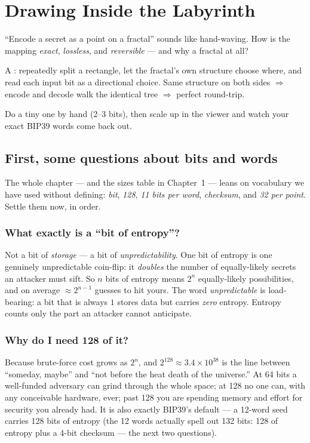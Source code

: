 \documentclass[a4paper,11pt]{report}
\newcommand{\probsoln}[3]{%
  \begin{description}[leftmargin=0pt,labelsep=0.5em,style=nextline]
    \item[\textcolor{attackcol}{Problem.}] #1
    \item[\textcolor{accent}{Solution.}] #2
    \item[\textcolor{modelcol}{Methodology.}] #3
  \end{description}}
\begin{document}
\chapter{Drawing Inside the Labyrinth}

\probsoln
{``Encode a secret as a point on a fractal'' sounds like hand-waving. How is the
mapping \emph{exact}, \emph{lossless}, and \emph{reversible} — and why a fractal
at all?}
{A \term{bisection bijection}: repeatedly split a rectangle, let the fractal's
own structure choose where, and read each input bit as a directional choice. Same
structure on both sides $\Rightarrow$ encode and decode walk the identical tree
$\Rightarrow$ perfect round-trip.}
{Do a tiny one by hand (2–3 bits), then scale up in the viewer and watch your
exact BIP39 words come back out.}

\section{First, some questions about bits and words}
The whole chapter — and the sizes table in Chapter~1 — leans on vocabulary we
have used without defining: \emph{bit}, \emph{128}, \emph{11 bits per word},
\emph{checksum}, and \emph{32 per point}. Settle them now, in order.

\subsection{What exactly is a ``bit of entropy''?}
Not a bit of \emph{storage} — a bit of \emph{unpredictability}. One bit of
entropy is one genuinely unpredictable coin-flip: it \emph{doubles} the number of
equally-likely secrets an attacker must sift. So $n$ bits of entropy means $2^n$
equally-likely possibilities, and on average $\approx 2^{n-1}$ guesses to hit
yours. The word \emph{unpredictable} is load-bearing: a bit that is always $1$
stores data but carries \emph{zero} entropy. Entropy counts only the part an
attacker cannot anticipate.

\subsection{Why do I need 128 of it?}
Because brute-force cost grows as $2^n$, and $2^{128}\approx 3.4\times10^{38}$ is
the line between ``someday, maybe'' and ``not before the heat death of the
universe.'' At 64 bits a well-funded adversary can grind through the whole space;
at 128 no one can, with any conceivable hardware, ever; past 128 you are spending
memory and effort for security you already had. It is also exactly BIP39's
default — a 12-word seed carries 128 bits of entropy (the 12 words actually spell
out 132 bits: 128 of entropy plus a 4-bit checksum — the next two questions).
\end{document}
